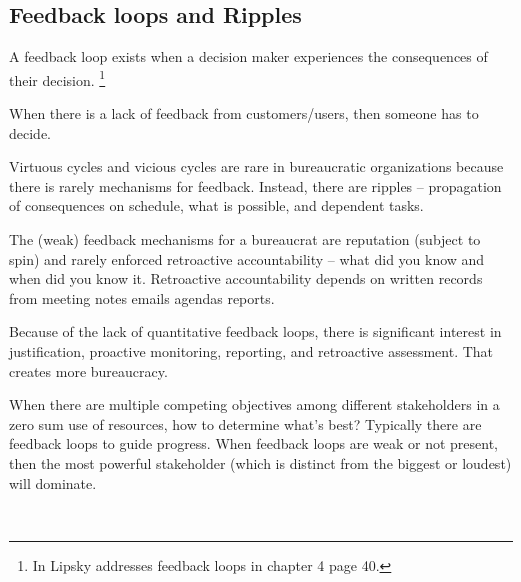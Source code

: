 \subsection*{Feedback loops and Ripples\label{sec:feedback-loop-and-ripples}}

A feedback loop exists when a decision maker experiences the consequences of their decision.
\footnote{In \cite{1983_Lipsky} Lipsky addresses feedback loops in chapter 4 page 40.}

When there is a lack of feedback from customers/users, then someone has to decide.


Virtuous cycles and vicious cycles are rare in bureaucratic organizations because there is rarely mechanisms for feedback. Instead, there are ripples -- propagation of consequences on schedule, what is possible, and dependent tasks.


The (weak) feedback mechanisms for a bureaucrat are reputation (subject to spin) and rarely enforced retroactive accountability -- what did you know and when did you know it.
Retroactive accountability depends on written records from meeting notes emails agendas reports.


Because of the lack of quantitative feedback loops, there is significant interest in justification, proactive monitoring, reporting, and retroactive assessment. That creates more bureaucracy.




When there are multiple competing objectives among different stakeholders in a zero sum use of resources, how to determine what's best? Typically there are feedback loops to guide progress. When feedback loops are weak or not present, then the most powerful stakeholder (which is distinct from the biggest or loudest) will dominate. 


\ \\


